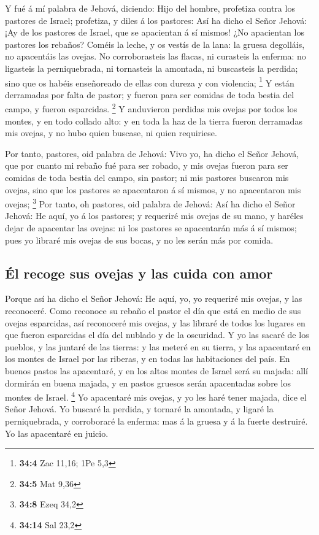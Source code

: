  Y fué á mí palabra de Jehová, diciendo: 
Hijo del hombre, profetiza contra los pastores de Israel; profetiza, y
diles á los pastores: Así ha dicho el Señor Jehová: ¡Ay de los pastores
de Israel, que se apacientan á sí mismos! ¿No apacientan los pastores
los rebaños?  Coméis la leche, y os vestís de la lana: la
gruesa degolláis, no apacentáis las ovejas.  No
corroborasteis las flacas, ni curasteis la enferma: no ligasteis la
perniquebrada, ni tornasteis la amontada, ni buscasteis la perdida; sino
que os habéis enseñoreado de ellas con dureza y con violencia;
\footnote{\textbf{34:4} Zac 11,16; 1Pe 5,3}  Y están
derramadas por falta de pastor; y fueron para ser comidas de toda bestia
del campo, y fueron esparcidas. \footnote{\textbf{34:5} Mat 9,36}
 Y anduvieron perdidas mis ovejas por todos los montes, y
en todo collado alto: y en toda la haz de la tierra fueron derramadas
mis ovejas, y no hubo quien buscase, ni quien requiriese.

 Por tanto, pastores, oid palabra de Jehová:
 Vivo yo, ha dicho el Señor Jehová, que por cuanto mi
rebaño fué para ser robado, y mis ovejas fueron para ser comidas de toda
bestia del campo, sin pastor; ni mis pastores buscaron mis ovejas, sino
que los pastores se apacentaron á sí mismos, y no apacentaron mis
ovejas; \footnote{\textbf{34:8} Ezeq 34,2}  Por tanto, oh
pastores, oid palabra de Jehová:  Así ha dicho el Señor
Jehová: He aquí, yo á los pastores; y requeriré mis ovejas de su mano, y
haréles dejar de apacentar las ovejas: ni los pastores se apacentarán
más á sí mismos; pues yo libraré mis ovejas de sus bocas, y no les serán
más por comida.

\hypertarget{uxe9l-recoge-sus-ovejas-y-las-cuida-con-amor}{%
\subsection{Él recoge sus ovejas y las cuida con
amor}\label{uxe9l-recoge-sus-ovejas-y-las-cuida-con-amor}}

 Porque así ha dicho el Señor Jehová: He aquí, yo, yo
requeriré mis ovejas, y las reconoceré.  Como reconoce su
rebaño el pastor el día que está en medio de sus ovejas esparcidas, así
reconoceré mis ovejas, y las libraré de todos los lugares en que fueron
esparcidas el día del nublado y de la oscuridad.  Y yo
las sacaré de los pueblos, y las juntaré de las tierras: y las meteré en
su tierra, y las apacentaré en los montes de Israel por las riberas, y
en todas las habitaciones del país.  En buenos pastos las
apacentaré, y en los altos montes de Israel será su majada: allí
dormirán en buena majada, y en pastos gruesos serán apacentadas sobre
los montes de Israel. \footnote{\textbf{34:14} Sal 23,2} 
Yo apacentaré mis ovejas, y yo les haré tener majada, dice el Señor
Jehová.  Yo buscaré la perdida, y tornaré la amontada, y
ligaré la perniquebrada, y corroboraré la enferma: mas á la gruesa y á
la fuerte destruiré. Yo las apacentaré en juicio.

